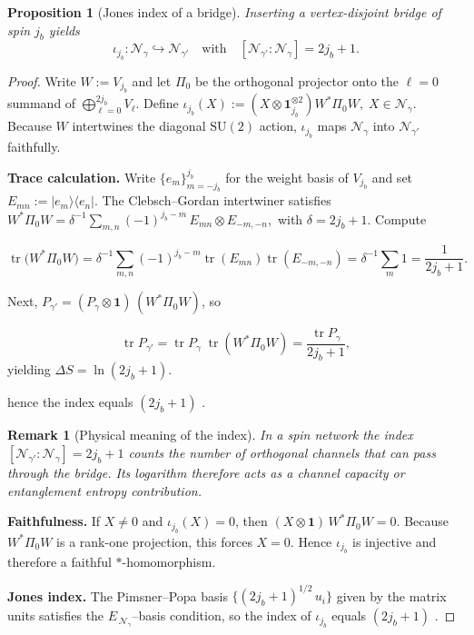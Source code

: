 \documentclass[11pt]{article}
\newtheorem{proposition}{Proposition}[section]
\newtheorem{remark}{Remark}[section]
\begin{document}
\begin{proposition}[Jones index of a bridge]
Inserting a vertex-disjoint bridge of spin $j_b$ yields
\[
  \iota_{j_b}:\mathcal N_{\gamma}\hookrightarrow \mathcal N_{\gamma'}
\quad\text{with}\quad
  [\mathcal N_{\gamma'}:\mathcal N_{\gamma}] = 2j_b+1.
\]
\end{proposition}

\begin{proof}
Write $W:=V_{j_b}$ and let $\Pi_0$ be the orthogonal projector onto the
$\ell=0$ summand of $\bigoplus_{\ell=0}^{2j_b}V_{\ell}$.  Define
\(
  \iota_{j_b}(X):=
  (X\otimes\mathbf 1_{j_b}^{\otimes2})W^{*}\Pi_0 W,
  \;X\in\mathcal N_{\gamma}.
\)
Because $W$ intertwines the diagonal $\mathrm{SU}(2)$ action,
$\iota_{j_b}$ maps $\mathcal N_{\gamma}$ into
$\mathcal N_{\gamma'}$ faithfully.

\medskip
\noindent\textbf{Trace calculation.}
Write $\{e_m\}_{m=-j_b}^{j_b}$ for the weight basis of $V_{j_b}$ and set
$E_{mn}:=|e_m\rangle\langle e_n|$.
The Clebsch–Gordan intertwiner satisfies
\(
  W^{*}\Pi_0 W
  =\delta^{-1}\!\sum_{m,n}(-1)^{j_b-m}\,E_{mn}\otimes E_{-m,-n},
\)
with $\delta=2j_b+1$.
Compute

\[
  \operatorname{tr}\bigl(W^{*}\Pi_0 W\bigr)
  =\delta^{-1}\sum_{m,n}(-1)^{j_b-m}
       \operatorname{tr}(E_{mn})\operatorname{tr}(E_{-m,-n})
  =\delta^{-1}\sum_{m}1
  =\frac{1}{2j_b+1}.
\]

Next, $P_{\gamma'}=(P_{\gamma}\otimes\mathbf1)\,(W^{*}\Pi_0 W)$, so

\[
  \operatorname{tr}P_{\gamma'}
  =\operatorname{tr}P_{\gamma}\;\operatorname{tr}(W^{*}\Pi_0 W)
  =\frac{\operatorname{tr}P_{\gamma}}{2j_b+1},
\]
yielding $\Delta S=\ln(2j_b+1)$.

hence the index equals $(2j_b+1)$ \cite[Thm.~2.1]{PopaCBMS}.

\begin{remark}[Physical meaning of the index]
In a spin network the index
$[\mathcal N_{\gamma'}:\mathcal N_{\gamma}]=2j_b+1$
counts the number of orthogonal channels that can pass through the bridge.
Its logarithm therefore acts as a \emph{channel capacity}
or entanglement entropy contribution.
\end{remark}

\noindent\textbf{Faithfulness.}
If $X\ne0$ and $\iota_{j_b}(X)=0$, 
then $(X\otimes\mathbf1)\,W^{*}\Pi_0 W=0$.
Because $W^{*}\Pi_0 W$ is a rank-one projection, this forces
$X=0$.  Hence $\iota_{j_b}$ is injective and therefore a faithful
\(*\)-homomorphism.

\medskip
\noindent\textbf{Jones index.}  
The Pimsner–Popa basis $\{(2j_b+1)^{1/2}\,u_i\}$ given by the matrix units
satisfies the \(E_{\,\mathcal N_\gamma}\)–basis condition, so the index of
$\iota_{j_b}$ equals $(2j_b+1)$ \cite[Thm.~2.1]{PopaCBMS}.
\end{proof}
\end{document}
